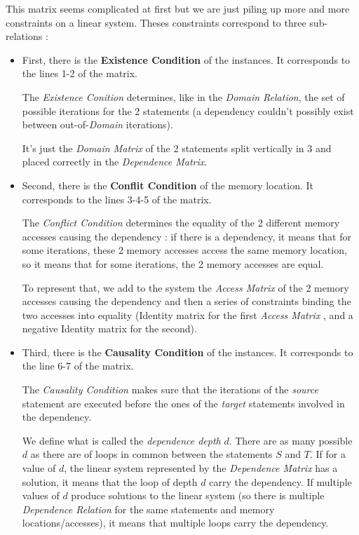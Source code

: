 \documentclass[paper=a4, fontsize=11.5pt]{scrartcl}
\numberwithin{equation}{section}        %
\numberwithin{figure}{section}          %
\numberwithin{table}{section}               %
\begin{document}
        This matrix seems complicated at first but we are just piling up more and more constraints
        on a linear system. Theses constraints correspond to three sub-relations :
        \begin{itemize}
            \item First, there is the \textbf{Existence Condition} of the instances.
                It corresponds to the lines 1-2 of the matrix.

                The \textit{Existence Conition} determines, like in the \textit{Domain Relation},
                the set of possible iterations for the 2 statements (a dependency couldn't
                possibly exist between out-of-\textit{Domain} iterations).

                It's just the \textit{Domain Matrix} of the 2 statements split vertically
                in 3 and placed correctly in the \textit{Dependence Matrix}.
            \item Second, there is the \textbf{Conflit Condition} of the memory location.
                It corresponds to the lines 3-4-5 of the matrix.

                The \textit{Conflict Condition} determines the equality of the 2 different 
                memory accesses causing the dependency : if there is a dependency,
                it means that for some iterations, these 2 memory accesses
                access the same memory location, so it means that for some iterations,
                the 2 memory accesses are equal.

                To represent that, we add to the system the \textit{Access Matrix} of the 2 memory accesses
                causing the dependency and then a series of constraints
                binding the two accesses into equality (Identity matrix for the first
                \textit{Access Matrix} , and a negative Identity matrix for the second).
            \item Third, there is the \textbf{Causality Condition} of the instances.
                It corresponds to the line 6-7 of the matrix.

                The \textit{Causality Condition} makes sure that the iterations of the
                \textit{source} statement are executed before the ones of the \textit{target} statements
                involved in the dependency.

                We define what is called the \textit{dependence depth} $d$. There are
                as many possible $d$ as there are of loops in common between the statements $S$ and $T$.
                If for a value of $d$, the linear system represented by the \textit{Dependence Matrix}
                has a solution, it means that the loop of depth $d$ carry the dependency.
                If multiple values of $d$ produce solutions to the linear system (so there
                is multiple \textit{Dependence Relation} for the same statements and
                memory locations/accesses), it means that multiple loops carry the dependency.


\end{itemize}
\end{document}
